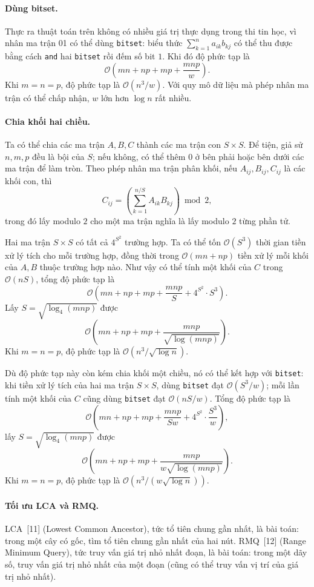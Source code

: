 \documentclass[11pt]{article}
\newcommand{\Oh}{\mathcal{O}}
\begin{document}
\paragraph{Dùng bitset.}
Thực ra thuật toán trên không có nhiều giá trị thực dụng trong thi tin học,
vì nhân ma trận 01 có thể dùng \texttt{bitset}: biểu thức
\(\sum_{k=1}^{n}a_{ik}b_{kj}\) có thể thu được bằng cách \texttt{and} hai
\texttt{bitset} rồi đếm số bit \(1\). Khi đó độ phức tạp là
\[
  \Oh\left(mn+np+mp+\frac{mnp}{w}\right).
\]
Khi \(m=n=p\), độ phức tạp là \(\Oh(n^3/w)\). Với quy mô dữ liệu mà phép nhân
ma trận có thể chấp nhận, \(w\) lớn hơn \(\log n\) rất nhiều.

\paragraph{Chia khối hai chiều.}
Ta có thể chia các ma trận \(A,B,C\) thành các ma trận con \(S\times S\). Để
tiện, giả sử \(n,m,p\) đều là bội của \(S\); nếu không, có thể thêm \(0\) ở
bên phải hoặc bên dưới các ma trận để làm tròn. Theo phép nhân ma trận phân
khối, nếu \(A_{ij},B_{ij},C_{ij}\) là các khối con, thì
\[
  C_{ij}=
  \left(\sum_{k=1}^{n/S}A_{ik}B_{kj}\right)\bmod 2,
\]
trong đó lấy modulo \(2\) cho một ma trận nghĩa là lấy modulo \(2\) từng phần
tử.

Hai ma trận \(S\times S\) có tất cả \(4^{S^2}\) trường hợp. Ta có thể tốn
\(\Oh(S^3)\) thời gian tiền xử lý tích cho mỗi trường hợp, đồng thời trong
\(\Oh(mn+np)\) tiền xử lý mỗi khối của \(A,B\) thuộc trường hợp nào. Như vậy
có thể tính một khối của \(C\) trong \(\Oh(nS)\), tổng độ phức tạp là
\[
  \Oh\left(mn+np+mp+\frac{mnp}{S}+4^{S^2}\cdot S^3\right).
\]
Lấy \(S=\sqrt{\log_4(mnp)}\) được
\[
  \Oh\left(mn+np+mp+\frac{mnp}{\sqrt{\log(mnp)}}\right).
\]
Khi \(m=n=p\), độ phức tạp là \(\Oh(n^3/\sqrt{\log n})\).

Dù độ phức tạp này còn kém chia khối một chiều, nó có thể kết hợp với
\texttt{bitset}: khi tiền xử lý tích của hai ma trận \(S\times S\), dùng
\texttt{bitset} đạt \(\Oh(S^3/w)\); mỗi lần tính một khối của \(C\) cũng dùng
\texttt{bitset} đạt \(\Oh(nS/w)\). Tổng độ phức tạp là
\[
  \Oh\left(mn+np+mp+\frac{mnp}{Sw}+4^{S^2}\cdot\frac{S^3}{w}\right),
\]
lấy \(S=\sqrt{\log_4(mnp)}\) được
\[
  \Oh\left(mn+np+mp+\frac{mnp}{w\sqrt{\log(mnp)}}\right).
\]
Khi \(m=n=p\), độ phức tạp là \(\Oh(n^3/(w\sqrt{\log n}))\).

\paragraph{Tối ưu LCA và RMQ.}
LCA~[11] (Lowest Common Ancestor), tức tổ tiên chung gần nhất, là bài toán:
trong một cây có gốc, tìm tổ tiên chung gần nhất của hai nút. RMQ~[12] (Range
Minimum Query), tức truy vấn giá trị nhỏ nhất đoạn, là bài toán: trong một dãy
số, truy vấn giá trị nhỏ nhất của một đoạn (cũng có thể truy vấn vị trí của
giá trị nhỏ nhất).
\end{document}
